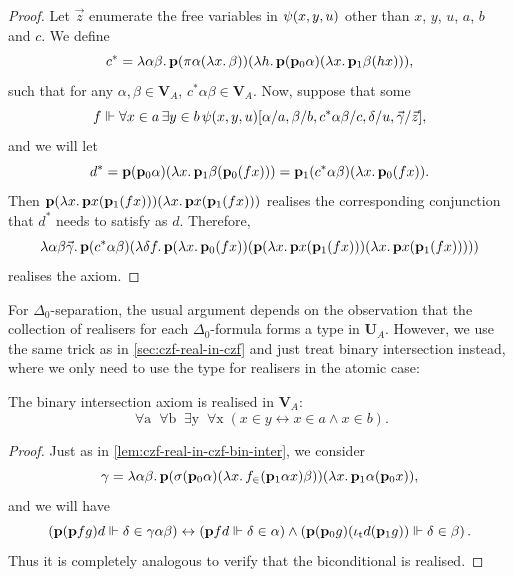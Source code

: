 \documentclass[12pt,openany]{book}
\theoremstyle{plain}
\theoremstyle{definition}
\newcommand\opA[1]{\mathop{\forall #1}}
\newcommand\opE[1]{\mathop{\exists #1}}
\newcommand\oplam[1]{\mathop{\lambda #1.}}
\newcommand\bp{\mathbf{p}}
\newcommand\iot{\iota_\textup{t}}
\newcommand\bU{\mathbf{U}}
\newcommand\bV{\mathbf{V}}
\begin{document}
\begin{proof}
  Let $\vec{z}$ enumerate the free variables in $\psi\mleft(x, y, u\mright)$ other than $x$, $y$, $u$, $a$, $b$ and $c$. We define
  \[c^* = \oplam{\alpha \beta} \bp \mleft(\pi \alpha \mleft(\oplam{x} \beta\mright)\mright) \mleft(\oplam{h} \bp \mleft(\bp_0 \alpha\mright) \mleft(\oplam{x} \bp_1 \beta \mleft(hx\mright)\mright)\mright),\]
  such that for any $\alpha, \beta \in \bV_A$, $c^* \alpha \beta \in \bV_A$. Now, suppose that some
  \[f \Vdash \opA{x \in a} \opE{y \in b} \psi\mleft(x, y, u\mright)\mleft[\alpha/a, \beta/b, c^* \alpha \beta/c, \delta/u, \vec{\gamma}/\vec{z}\mright],\]
  and we will let
  \[d^* = \bp \mleft(\bp_0 \alpha\mright) \mleft(\oplam{x} \bp_1 \beta \mleft(\bp_0 \mleft(fx\mright)\mright)\mright) = \bp_1 \mleft(c^* \alpha \beta\mright) \mleft(\oplam{x} \bp_0 \mleft(fx\mright)\mright).\]
  Then $\bp \mleft(\oplam{x} \bp x \mleft(\bp_1 \mleft(fx\mright)\mright)\mright) \mleft(\oplam{x} \bp x \mleft(\bp_1 \mleft(fx\mright)\mright)\mright)$ realises the corresponding conjunction that $d^*$ needs to satisfy as $d$. Therefore,
  \[\oplam{\alpha \beta \vec{\gamma}} \bp \mleft(c^* \alpha \beta\mright) \mleft(\oplam{\delta f} \bp \mleft(\oplam{x} \bp_0 \mleft(fx\mright)\mright) \mleft(\bp \mleft(\oplam{x} \bp x \mleft(\bp_1 \mleft(fx\mright)\mright)\mright) \mleft(\oplam{x} \bp x \mleft(\bp_1 \mleft(fx\mright)\mright)\mright)\mright)\mright)\]
  realises the axiom.
\end{proof}

For $\Delta_0$-separation, the usual argument depends on the observation that the collection of realisers for each $\Delta_0$-formula forms a type in $\bU_A$. However, we use the same trick as in \autoref{sec:czf-real-in-czf} and just treat binary intersection instead, where we only need to use the type for realisers in the atomic case:
\begin{lemma}
  The binary intersection axiom is realised in $\bV_A$:
  \[\opA{a} \opA{b} \opE{y} \opA{x} \left(x \in y \leftrightarrow x \in a \land x \in b\right).\]
\end{lemma}

\begin{proof}
  Just as in \autoref{lem:czf-real-in-czf-bin-inter}, we consider
  \[\gamma = \oplam{\alpha \beta} \bp \mleft(\sigma \mleft(\bp_0 \alpha\mright) \mleft(\oplam{x} f_\in \mleft(\bp_1 \alpha x\mright) \beta\mright)\mright) \mleft(\oplam{x} \bp_1 \alpha \mleft(\bp_0 x\mright)\mright),\]
  and we will have
  \[\left(\bp \mleft(\bp fg\mright) d \Vdash \delta \in \gamma \alpha \beta\right) \leftrightarrow \left(\bp fd \Vdash \delta \in \alpha\right) \land \left(\bp \mleft(\bp_0 g\mright) \mleft(\iot d \mleft(\bp_1 g\mright)\mright) \Vdash \delta \in \beta\right).\]
  Thus it is completely analogous to verify that the biconditional is realised.
\end{proof}
\end{document}
